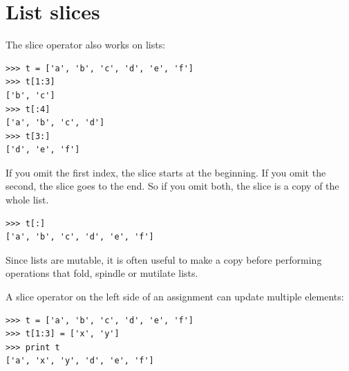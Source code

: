 \documentclass[10pt]{book}
\begin{document}
\section{List slices}


The slice operator also works on lists:

\beforeverb
\begin{verbatim}
>>> t = ['a', 'b', 'c', 'd', 'e', 'f']
>>> t[1:3]
['b', 'c']
>>> t[:4]
['a', 'b', 'c', 'd']
>>> t[3:]
['d', 'e', 'f']
\end{verbatim}
\afterverb
%
If you omit the first index, the slice starts at the beginning.
If you omit the second, the slice goes to the end.  So if you
omit both, the slice is a copy of the whole list.


\beforeverb
\begin{verbatim}
>>> t[:]
['a', 'b', 'c', 'd', 'e', 'f']
\end{verbatim}
\afterverb
%
Since lists are mutable, it is often useful to make a copy
before performing operations that fold, spindle or mutilate
lists.


A slice operator on the left side of an assignment
can update multiple elements:


\beforeverb
\begin{verbatim}
>>> t = ['a', 'b', 'c', 'd', 'e', 'f']
>>> t[1:3] = ['x', 'y']
>>> print t
['a', 'x', 'y', 'd', 'e', 'f']
\end{verbatim}
\afterverb
%


%

%
\end{document}
